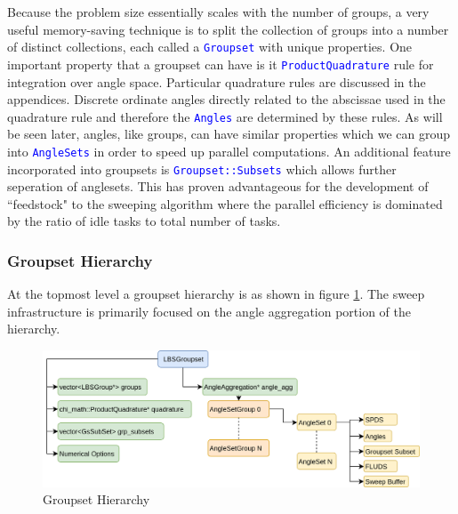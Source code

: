 \documentclass[11pt,letterpaper,titlepage]{article}
\newcommand{\xmltag}[1]{\textcolor{blue}{ \texttt{#1}} }
\numberwithin{equation}{section}
\begin{document}
Because the problem size essentially scales with the number of groups, a very useful memory-saving technique is to split the collection of groups into a number of distinct collections, each called a \xmltag{Groupset} with unique properties. One important property that a groupset can have is it \xmltag{ProductQuadrature} rule for integration over angle space. Particular quadrature rules are discussed in the appendices. Discrete ordinate angles directly related to the abscissae used in the quadrature rule and therefore the \xmltag{Angles} are determined by these rules. As will be seen later, angles, like groups, can have similar properties which we can group into \xmltag{AngleSets} in order to speed up parallel computations.
\newline
\newline
An additional feature incorporated into groupsets is \xmltag{Groupset::Subsets} which allows further seperation of anglesets. This has proven advantageous for the development of ``feedstock" to the sweeping algorithm where the parallel efficiency is dominated by the ratio of idle tasks to total number of tasks.

\subsubsection{Groupset Hierarchy}
At the topmost level a groupset hierarchy is as shown in figure \ref{fig:groupsethierarchy}. The sweep infrastructure is primarily focused on the angle aggregation portion of the hierarchy.

\begin{figure}[H]
\centering
\includegraphics[width=0.9\linewidth]{LatexDraw/GroupsetHierarchy.png}
\caption{Groupset Hierarchy}
\label{fig:groupsethierarchy}
\end{figure}
\end{document}
